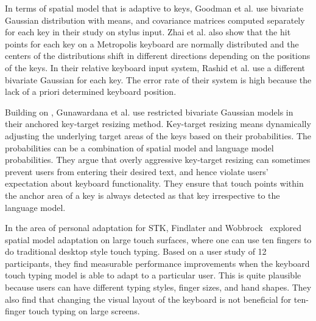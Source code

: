 \documentclass{sigchi}
\begin{document}
In terms of spatial model that is adaptive to keys, Goodman et al. \cite{Goodman:2002} use bivariate Gaussian distribution with means, and
covariance matrices computed separately for each key in their study on stylus input. Zhai et al. \cite{Zhai:2002} also show that
the hit points for each key on a Metropolis keyboard \cite{Zhai:2000} are normally distributed and 
the centers of the distributions shift in different directions depending on the positions of
the keys. In their relative keyboard input system, Rashid et al. \cite{Rashid:2008} use a different bivariate Gaussian for each key. The error rate of their system is high because the lack of 
a priori determined keyboard position.

Building on \cite{Goodman:2002}, Gunawardana et al. \cite{Gunawardana:2010} use restricted bivariate Gaussian
models in their anchored key-target resizing method. Key-target resizing means dynamically
adjusting the underlying target areas of the keys based on their probabilities. The probabilities can 
be a combination of spatial model and language model probabilities.
They argue that overly aggressive
key-target resizing can sometimes prevent users from entering their desired text, and hence violate
users' expectation about keyboard functionality. They ensure that touch points within
the anchor area of a key is always detected as that key irrespective to the language model.

In the area of personal adaptation for STK, Findlater and
Wobbrock~\cite{Findlater:2012} explored spatial model adaptation on large touch 
surfaces, where one can use ten fingers to do traditional desktop style touch 
typing. Based on a user study of 12 participants, they find measurable
performance improvements when the keyboard touch typing model is able to adapt to a particular user. This is quite plausible because users can have different typing styles, finger sizes, and hand shapes. They also find that changing the visual layout of the keyboard is not beneficial for ten-finger touch typing on large screens.
\end{document}
